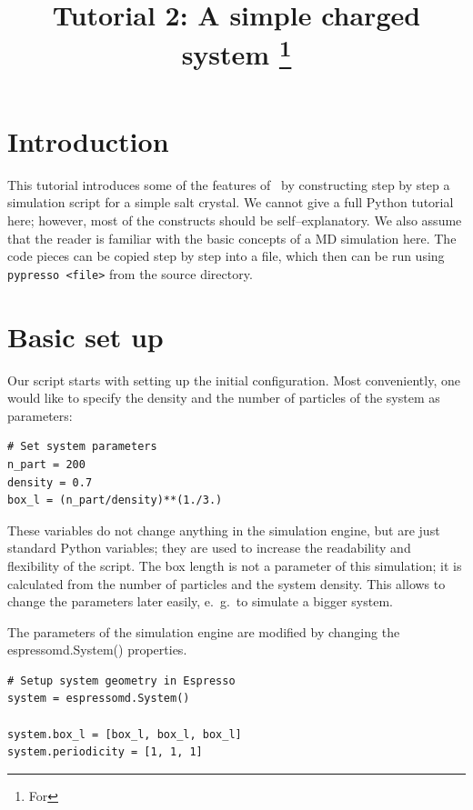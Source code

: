 \documentclass[
a4paper,                        %
11pt,                           %
twoside,                        %
footsepline,                    %
headsepline,                    %
headexclude,                    %
footexclude,                    %
pagesize,                       %
]{scrartcl}
\begin{document}
\esptitlehead
\title{Tutorial 2: A simple charged system%
\ifdefined\esversion%
\thanks{For \es \esversion}%
\fi%
}

\maketitle
\tableofcontents

\section{Introduction}

This tutorial introduces some of the features of \es\ by constructing
step by step a simulation script for a simple salt crystal.  We cannot
give a full Python tutorial here; however, most of the constructs should
be self--explanatory. We also assume that the reader is familiar with
the basic concepts of a MD simulation here. The code pieces can be
copied step by step into a file, which then can be run using
\verb|pypresso <file>| from the \es source directory.

\section{Basic set up}

Our script starts with setting up the initial configuration.  Most
conveniently, one would like to specify the density and the number of
particles of the system as parameters:

\begin{lstlisting}
# Set system parameters
n_part = 200
density = 0.7
box_l = (n_part/density)**(1./3.)
\end{lstlisting}

These variables do not change anything in the simulation engine, but
are just standard Python variables; they are used to increase the
readability and flexibility of the script. The box length is not a
parameter of this simulation; it is calculated from the number of
particles and the system density. This allows to change the parameters
later easily, e.~g.\ to simulate a bigger system.

The parameters of the simulation engine are modified by changing the
espressomd.System() properties.

\begin{lstlisting}
# Setup system geometry in Espresso
system = espressomd.System()

system.box_l = [box_l, box_l, box_l]
system.periodicity = [1, 1, 1]
\end{lstlisting}
\end{document}
